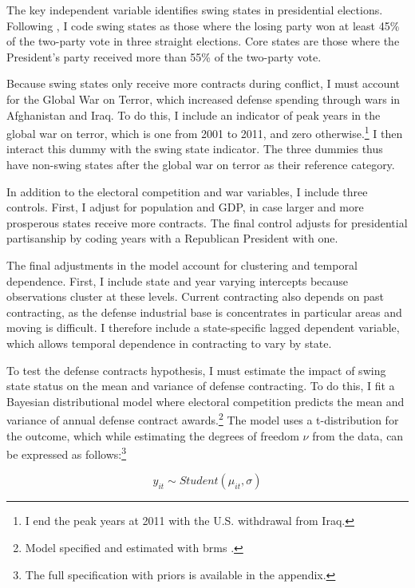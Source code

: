 \documentclass[12pt]{article}
\begin{document}
The key independent variable identifies swing states in presidential elections. 
Following \citet{KrinerReeves2015}, I code swing states as those where the losing party won at least 45\% of the two-party vote in three straight elections. 
Core states are those where the President's party received more than 55\% of the two-party vote. 


Because swing states only receive more contracts during conflict, I must account for the Global War on Terror, which increased defense spending through wars in Afghanistan and Iraq.  
To do this, I include an indicator of peak years in the global war on terror, which is one from 2001 to 2011, and zero otherwise.\footnote{I end the peak years at 2011 with the U.S. withdrawal from Iraq.} 
I then interact this dummy with the swing state indicator. 
The three dummies thus have non-swing states after the global war on terror as their reference category. 


In addition to the electoral competition and war variables, I include three controls. 
First, I adjust for population and GDP, in case larger and more prosperous states receive more contracts. 
The final control adjusts for presidential partisanship by coding years with a Republican President with one. 


The final adjustments in the model account for clustering and temporal dependence.
First, I include state and year varying intercepts because observations cluster at these levels. 
Current contracting also depends on past contracting, as the defense industrial base is concentrates in particular areas and moving is difficult. 
I therefore include a state-specific lagged dependent variable, which allows temporal dependence in contracting to vary by state. 


To test the defense contracts hypothesis, I must estimate the impact of swing state status on the mean and variance of defense contracting. 
To do this, I fit a Bayesian distributional model where electoral competition predicts the mean and variance of annual defense contract awards.\footnote{Model specified and estimated with \textsf{brms} \citep{Buerkner2017}.}
The model uses a t-distribution for the outcome, which while estimating the degrees of freedom $\nu$ from the data, can be expressed as follows:\footnote{The full specification with priors is available in the appendix.} 


\begin{equation}
y_{it} \sim Student(\mu_{it}, \sigma)
\end{equation}
\end{document}
